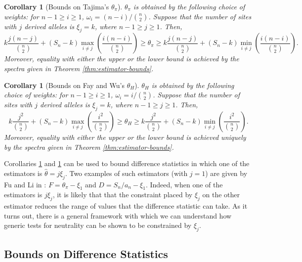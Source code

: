 \documentclass[lettersize, 10pt]{article}
\newtheorem{cor}[thm]{Corollary}
\begin{document}
\begin{cor}[Bounds on Tajima's $\theta_\pi$]\label{cor:tajima-pi}
$\theta_\pi$ is obtained by the following choice of weights: for $n-1\geqslant i\geqslant 1$, $\omega_i=(n-i)\big/{n\choose 2}$. Suppose that the number of sites with $j$ derived alleles is $\xi_j=k$, where $n-1\geqslant j\geqslant 1$. Then, 
\begin{equation*}
k\frac{j(n-j)}{{n\choose 2}} + (S_n-k)\max_{i\neq j}\left(\frac{i(n-i)}{{n\choose 2}}\right)\geqslant \theta_\pi \geqslant k\frac{j(n-j)}{{n\choose 2}} + (S_n-k)\min_{i\neq j}\left(\frac{i(n-i)}{{n\choose 2}}\right).
\end{equation*}
Moreover, equality with either the upper or the lower bound is achieved by the spectra given in Theorem \ref{thm:estimator-bounds}.
\end{cor}

\begin{cor}[Bounds on Fay and Wu's $\theta_H$]\label{cor:faywu-thetaH}
$\theta_H$ is obtained by the following choice of weights: for $n-1\geqslant i\geqslant 1$, $\omega_i=i\big/{n\choose 2}$. Suppose that the number of sites with $j$ derived alleles is $\xi_j=k$, where $n-1\geqslant j\geqslant 1$. Then, 
\begin{equation*}
k\frac{j^2}{{n\choose 2}} + (S_n-k)\max_{i\neq j}\left(\frac{i^2}{{n\choose 2}}\right)\geqslant \theta_H \geqslant k\frac{j^2}{{n\choose 2}} + (S_n-k)\min_{i\neq j}\left(\frac{i^2}{{n\choose 2}}\right).
\end{equation*}
Moreover, equality with either the upper or the lower bound is achieved uniquely by the spectra given in Theorem \ref{thm:estimator-bounds}.
\end{cor}

Corollaries \ref{cor:tajima-pi} and \ref{cor:faywu-thetaH} can be used to bound difference statistics in which one of the estimators is $\hat{\theta}= j\xi_j$. Two examples of such estimators (with $j=1$) are given by Fu and Li in \cite{Fu1993}: $F=\theta_\pi - \xi_1$ and $D = S_n/a_n - \xi_1$. Indeed, when one of the estimators is $j\xi_j$, it is likely that that the constraint placed by $\xi_j$ on the other estimator reduces the range of values that the difference statistic can take. As it turns out, there is a general framework with which we can understand how generic tests for neutrality can be shown to be constrained by $\xi_j$.

\subsection*{Bounds on Difference Statistics}
\end{document}
